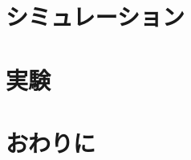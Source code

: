 \documentclass[a4j,11pt,twoside]{jbook}
\begin{document}

\chapter{シミュレーション}



\chapter{実験}



\chapter{おわりに}





\end{document}

